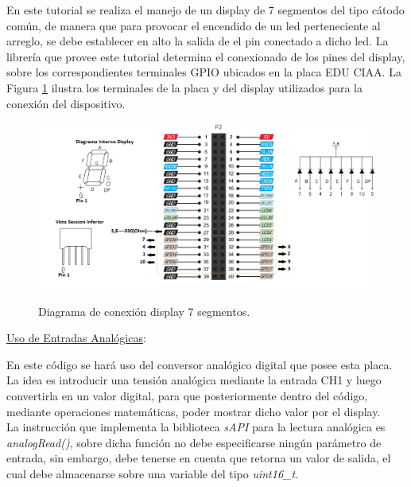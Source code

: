 \documentclass[12pt,letterpaper]{article}
\begin{document}
En este tutorial se realiza el manejo de un display de 7 segmentos del tipo cátodo común, de manera que para provocar el encendido de un led perteneciente al arreglo, se debe establecer en alto la salida de el pin conectado a dicho led. La librería que provee este tutorial determina el conexionado de los pines del display, sobre los correspondientes terminales GPIO ubicados en la placa EDU CIAA. La Figura \ref{Fig23} ilustra los terminales de la placa y del display utilizados para la conexión del dispositivo.


\begin{figure}[H]
\centering
\includegraphics[width=10 cm]{figuras/f5.png}\\
\caption{Diagrama de conexión display 7 segmentos.}
\label{Fig23}
\end{figure}

\underline{Uso de Entradas Analógicas}:

En este código se hará uso del conversor analógico digital que posee esta placa. La idea es introducir una tensión analógica mediante la entrada CH1 y luego convertirla en un valor digital, para que posteriormente dentro del código, mediante operaciones matemáticas, poder mostrar dicho valor por el display.
 \\
 
La instrucción que implementa la biblioteca \textit{sAPI} para la lectura analógica es \textit{analogRead()}, sobre dicha función no debe especificarse ningún parámetro de entrada, sin embargo, debe tenerse en cuenta que retorna un valor de salida, el cual debe almacenarse sobre una variable del tipo \textit{uint16_t}.
\end{document}
